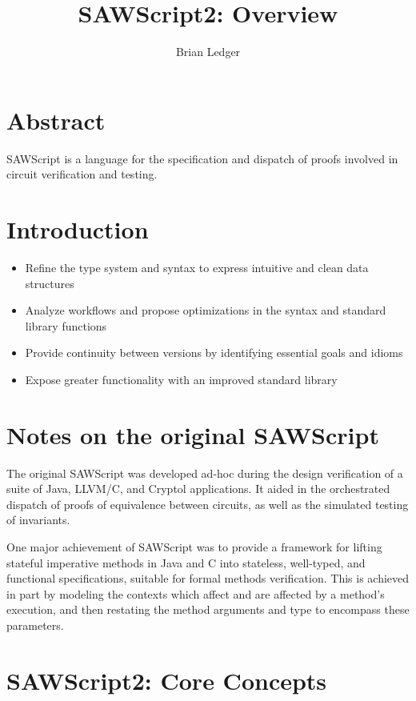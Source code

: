 \documentclass[11pt]{amsart}
\title{SAWScript2: Overview}
\author{Brian Ledger}
\begin{document}
\maketitle

\section*{Abstract}

SAWScript is a language for the specification and dispatch of proofs involved in circuit verification and testing.  

\section*{Introduction}

\begin{itemize}
\item Refine the type system and syntax to express intuitive and clean data structures
\item Analyze workflows and propose optimizations in the syntax and standard library functions
\item Provide continuity between versions by identifying essential goals and idioms
\item Expose greater functionality with an improved standard library
\end{itemize}

\section*{Notes on the original SAWScript}

The original SAWScript was developed ad-hoc during the design verification of a suite of Java, LLVM/C, and Cryptol applications.  It aided in the orchestrated dispatch of proofs of equivalence between circuits, as well as the simulated testing of invariants.

One major achievement of SAWScript was to provide a framework for lifting stateful imperative methods in Java and C into stateless, well-typed, and functional specifications, suitable for formal methods verification.  This is achieved in part by modeling the contexts which affect and are affected by a method's execution, and then restating the method arguments and type to encompass these parameters.



\section*{SAWScript2: Core Concepts}
\end{document}
